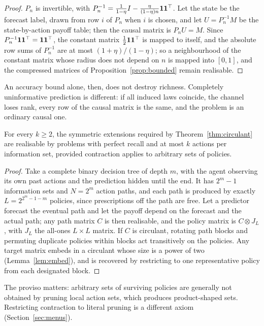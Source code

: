 \begin{proof}
$P_n$ is invertible, with $P_n^{-1}=\frac1{1-\eta}I-\frac{\eta}{(1-\eta)n}\mathbf{1}\mathbf{1}^\top$. Let the state be
the forecast label, drawn from row $i$ of $P_n$ when $i$ is chosen, and let $U=P_n^{-1}M$ be the
state-by-action payoff table; then the causal matrix is $P_nU=M$. Since $P_n^{-1}\mathbf{1}\mathbf{1}^\top=\mathbf{1}\mathbf{1}^\top$,
the constant matrix $\tfrac12\mathbf{1}\mathbf{1}^\top$ is mapped to itself, and the absolute row sums of $P_n^{-1}$ are
at most $(1+\eta)/(1-\eta)$; so a neighbourhood of the constant matrix whose radius does not depend on
$n$ is mapped into $[0,1]$, and the compressed matrices of Proposition~\ref{prop:bounded} remain
realisable.
\end{proof}

An accuracy bound alone, then, does not destroy richness. Completely uninformative prediction is
different: if all induced laws coincide, the channel loses rank, every row of the causal matrix is
the same, and the problem is an ordinary causal one.

\begin{proposition}\label{prop:binarytree}
For every $k\ge2$, the symmetric extensions required by Theorem~\ref{thm:circulant} are realisable
by problems with perfect recall and at most $k$ actions per information set, provided contraction
applies to arbitrary sets of policies.
\end{proposition}

\begin{proof}
Take a complete binary decision tree of depth $m$, with the agent observing its own past actions
and the prediction hidden until the end. It has $2^m-1$ information sets and $N=2^m$ action paths,
and each path is produced by exactly $L=2^{2^m-1-m}$ policies, since prescriptions off the path are
free. Let a predictor forecast the eventual path and let the payoff depend on the forecast and the
actual path; any path matrix $C$ is then realisable, and the policy matrix is $C\otimes J_L$, with $J_L$
the all-ones $L\times L$ matrix. If $C$ is circulant, rotating path blocks and permuting duplicate
policies within blocks act transitively on the policies. Any target matrix embeds in a circulant
whose size is a power of two (Lemma~\ref{lem:embed}), and is recovered by restricting to one
representative policy from each designated block.
\end{proof}

The proviso matters: arbitrary sets of surviving policies are generally not obtained by pruning local
action sets, which produces product-shaped sets. Restricting contraction to literal pruning is a
different axiom (Section~\ref{sec:menus}).

